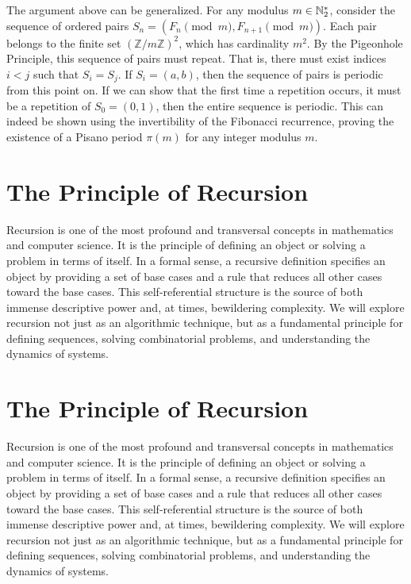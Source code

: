 \begin{remark}
The argument above can be generalized. For any modulus $m \in \mathbb{N}_{2}^*$, consider the sequence of ordered pairs $S_n = (F_n \pmod m, F_{n+1} \pmod m)$. Each pair belongs to the finite set $(\mathbb{Z}/m\mathbb{Z})^2$, which has cardinality $m^2$. By the Pigeonhole Principle, this sequence of pairs must repeat. That is, there must exist indices $i < j$ such that $S_i = S_j$. If $S_i = (a, b)$, then the sequence of pairs is periodic from this point on. If we can show that the first time a repetition occurs, it must be a repetition of $S_0 = (0,1)$, then the entire sequence is periodic. This can indeed be shown using the invertibility of the Fibonacci recurrence, proving the existence of a Pisano period $\pi(m)$ for any integer modulus $m$.
\end{remark}

\section{The Principle of Recursion}

Recursion is one of the most profound and transversal concepts in mathematics and computer science. It is the principle of defining an object or solving a problem in terms of itself. In a formal sense, a recursive definition specifies an object by providing a set of base cases and a rule that reduces all other cases toward the base cases. This self-referential structure is the source of both immense descriptive power and, at times, bewildering complexity. We will explore recursion not just as an algorithmic technique, but as a fundamental principle for defining sequences, solving combinatorial problems, and understanding the dynamics of systems.


\section{The Principle of Recursion}

Recursion is one of the most profound and transversal concepts in mathematics and computer science. It is the principle of defining an object or solving a problem in terms of itself. In a formal sense, a recursive definition specifies an object by providing a set of base cases and a rule that reduces all other cases toward the base cases. This self-referential structure is the source of both immense descriptive power and, at times, bewildering complexity. We will explore recursion not just as an algorithmic technique, but as a fundamental principle for defining sequences, solving combinatorial problems, and understanding the dynamics of systems.

